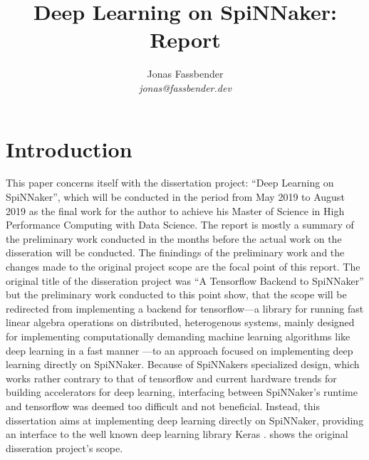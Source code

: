 \documentclass{article}
\begin{document}

\title{Deep Learning on SpiNNaker: Report}
\author{Jonas Fassbender \\ \textit{jonas@fassbender.dev}}
\date{}

\makeEPCCtitle

\newpage

\tableofcontents

\newpage

\begin{abstract}
\end{abstract}

\newpage


\section{Introduction} %

This paper concerns itself with the dissertation project:
``Deep Learning on SpiNNaker'', which will be conducted in
the period from May 2019 to August 2019 as the final work
for the author to achieve his Master of Science in
High Performance Computing with Data Science.
The report is mostly a summary of the preliminary work
conducted in the months before the actual work on the
disseration will be conducted.
The finindings of the preliminary work and the changes made
to the original project scope are the focal point of this
report.
The original title of the disseration project was ``A
Tensorflow Backend to SpiNNaker'' but the preliminary work
conducted to this point show, that the scope will be
redirected from implementing a backend for tensorflow---a
library for running fast linear algebra operations on
distributed, heterogenous systems, mainly designed for
implementing computationally demanding machine learning
algorithms like deep learning in a fast manner
\citep{tf2015}---to an approach focused on implementing
deep learning directly on SpiNNaker.
Because of SpiNNakers specialized design, which works
rather contrary to that of tensorflow and current hardware
trends for building accelerators for deep learning,
interfacing between SpiNNaker's runtime and tensorflow was
deemed too difficult and not beneficial.
Instead, this dissertation aims at implementing deep
learning directly on SpiNNaker, providing an interface to
the well known deep learning library Keras \citep{keras}.
\citet{proj} shows the original disseration project's
scope.
\end{document}
